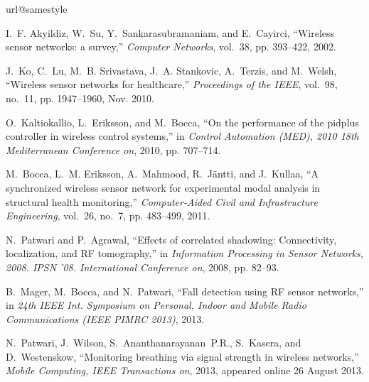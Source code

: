\documentclass[journal, 10pt, twocolumn, balance]{IEEEtran}
\begin{document}
\begin{thebibliography}{10}
\providecommand{\url}[1]{#1}
\csname url@samestyle\endcsname
\providecommand{\newblock}{\relax}
\providecommand{\bibinfo}[2]{#2}
\providecommand{\BIBentrySTDinterwordspacing}{\spaceskip=0pt\relax}
\providecommand{\BIBentryALTinterwordstretchfactor}{4}
\providecommand{\BIBentryALTinterwordspacing}{\spaceskip=\fontdimen2\font plus
\BIBentryALTinterwordstretchfactor\fontdimen3\font minus
  \fontdimen4\font\relax}
\providecommand{\BIBforeignlanguage}[2]{{\expandafter\ifx\csname l@#1\endcsname\relax
\typeout{** WARNING: IEEEtran.bst: No hyphenation pattern has been}\typeout{** loaded for the language `#1'. Using the pattern for}\typeout{** the default language instead.}\else
\language=\csname l@#1\endcsname
\fi
#2}}
\providecommand{\BIBdecl}{\relax}
\BIBdecl

I.~F. Akyildiz, W.~Su, Y.~Sankarasubramaniam, and E.~Cayirci, ``{Wireless
  sensor networks: a survey},'' \emph{Computer Networks}, vol.~38, pp.
  393--422, 2002.

J.~Ko, C.~Lu, M.~B. Srivastava, J.~A. Stankovic, A.~Terzis, and M.~Welsh,
  ``Wireless sensor networks for healthcare,'' \emph{Proceedings of the IEEE},
  vol.~98, no.~11, pp. 1947--1960, Nov. 2010.

O.~Kaltiokallio, L.~Eriksson, and M.~Bocca, ``On the performance of the pidplus
  controller in wireless control systems,'' in \emph{Control Automation (MED),
  2010 18th Mediterranean Conference on}, 2010, pp. 707--714.

M.~Bocca, L.~M. Eriksson, A.~Mahmood, R.~J\"{a}ntti, and J.~Kullaa, ``A
  synchronized wireless sensor network for experimental modal analysis in
  structural health monitoring,'' \emph{Computer-Aided Civil and Infrastructure
  Engineering}, vol.~26, no.~7, pp. 483--499, 2011.

N.~Patwari and P.~Agrawal, ``Effects of correlated shadowing: Connectivity,
  localization, and {RF} tomography,'' in \emph{Information Processing in
  Sensor Networks, 2008. IPSN '08. International Conference on}, 2008, pp.
  82--93.

B.~Mager, M.~Bocca, and N.~Patwari, ``Fall detection using {RF} sensor
  networks,'' in \emph{24th IEEE Int. Symposium on Personal, Indoor and Mobile
  Radio Communications (IEEE PIMRC 2013)}, 2013.

N.~Patwari, J.~Wilson, S.~Ananthanarayanan~P.R., S.~Kasera, and D.~Westenskow,
  ``Monitoring breathing via signal strength in wireless networks,''
  \emph{Mobile Computing, IEEE Transactions on}, 2013, appeared online 26
  August 2013.


\end{thebibliography}
\end{document}
